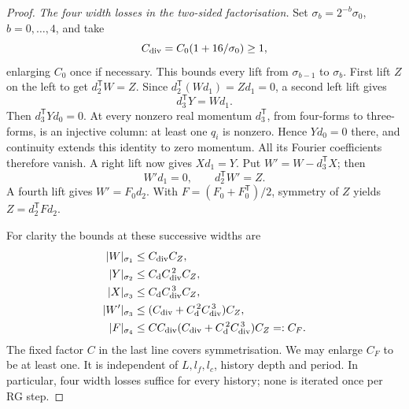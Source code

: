 \documentclass[11pt,reqno]{amsart}
\numberwithin{equation}{section}
\theoremstyle{definition}
\theoremstyle{remark}
\begin{document}
\begin{proof}
\smallskip\noindent
\emph{The four width losses in the two-sided factorisation.}
Set \(\sigma_b=2^{-b}\sigma_0\), \(b=0,\ldots,4\), and take
\[
                 C_{\rm div}=C_0(1+16/\sigma_0)\ge1,
\]
enlarging \(C_0\) once if necessary. This bounds every lift
from \(\sigma_{b-1}\) to \(\sigma_b\).
First lift \(Z\) on the left to get \(d_2^{\mathsf T}W=Z\).
Since \(d_2^{\mathsf T}(Wd_1)=Zd_1=0\), a second left lift gives
\[
                         d_3^{\mathsf T}Y=Wd_1.
\]
Then \(d_3^{\mathsf T}Yd_0=0\). At every nonzero real momentum
\(d_3^{\mathsf T}\), from four-forms to three-forms, is an injective
column: at least one \(q_i\) is nonzero. Hence \(Yd_0=0\)
there, and continuity extends this identity to zero momentum.
All its Fourier coefficients therefore vanish. A right lift
now gives \(Xd_1=Y\). Put \(W'=W-d_3^{\mathsf T}X\); then
\[
                         W'd_1=0,\qquad d_2^{\mathsf T}W'=Z.
\]
A fourth lift gives \(W'=F_0d_2\). With
\(F=(F_0+F_0^{\mathsf T})/2\), symmetry of \(Z\) yields
\(Z=d_2^{\mathsf T}Fd_2\).

For clarity the bounds at these successive widths are
\begin{equation}
 \begin{aligned}
 |W|_{\sigma_1}&\le C_{\rm div}C_Z,\\
 |Y|_{\sigma_2}&\le C_{\rm d}C_{\rm div}^{\,2}C_Z,\\
 |X|_{\sigma_3}&\le C_{\rm d}C_{\rm div}^{\,3}C_Z,\\
 |W'|_{\sigma_3}
 &\le(C_{\rm div}+C_{\rm d}^{\,2}C_{\rm div}^{\,3})C_Z,\\
 |F|_{\sigma_4}
 &\le C C_{\rm div}
            (C_{\rm div}+C_{\rm d}^{\,2}C_{\rm div}^{\,3})C_Z
   =:C_F.
 \end{aligned}
 \label{eq:packet-four-lift-prices}
\end{equation}
The fixed factor \(C\) in the last line covers symmetrisation.
We may enlarge \(C_F\) to be at least one. It is independent
of \(L,l_f,l_c\), history depth and period. In particular,
four width losses suffice for every history; none is
iterated once per RG step.


\end{proof}
\end{document}

